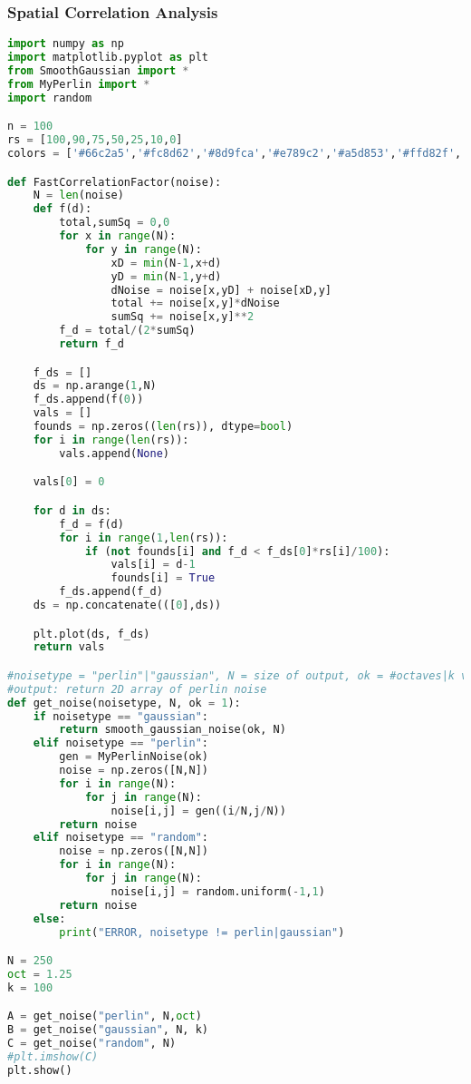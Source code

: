 \documentclass[11pt,a4paper]{article}
\begin{document}
\subsubsection{Spatial Correlation Analysis}
\begin{lstlisting}[language=Python, mathescape=true]
import numpy as np
import matplotlib.pyplot as plt
from SmoothGaussian import *
from MyPerlin import *
import random

n = 100
rs = [100,90,75,50,25,10,0]
colors = ['#66c2a5','#fc8d62','#8d9fca','#e789c2','#a5d853','#ffd82f','#e5c494']

def FastCorrelationFactor(noise):
    N = len(noise)
    def f(d):
        total,sumSq = 0,0
        for x in range(N):
            for y in range(N):
                xD = min(N-1,x+d)
                yD = min(N-1,y+d)
                dNoise = noise[x,yD] + noise[xD,y]
                total += noise[x,y]*dNoise
                sumSq += noise[x,y]**2
        f_d = total/(2*sumSq)
        return f_d

    f_ds = []
    ds = np.arange(1,N)
    f_ds.append(f(0))
    vals = []
    founds = np.zeros((len(rs)), dtype=bool)
    for i in range(len(rs)):
        vals.append(None)

    vals[0] = 0

    for d in ds:
        f_d = f(d)
        for i in range(1,len(rs)):
            if (not founds[i] and f_d < f_ds[0]*rs[i]/100):
                vals[i] = d-1
                founds[i] = True
        f_ds.append(f_d)
    ds = np.concatenate(([0],ds))

    plt.plot(ds, f_ds)
    return vals

#noisetype = "perlin"|"gaussian", N = size of output, ok = #octaves|k value
#output: return 2D array of perlin noise
def get_noise(noisetype, N, ok = 1):
    if noisetype == "gaussian":
        return smooth_gaussian_noise(ok, N)
    elif noisetype == "perlin":
        gen = MyPerlinNoise(ok)
        noise = np.zeros([N,N])
        for i in range(N):
            for j in range(N):
                noise[i,j] = gen((i/N,j/N))
        return noise
    elif noisetype == "random":
        noise = np.zeros([N,N])
        for i in range(N):
            for j in range(N):
                noise[i,j] = random.uniform(-1,1)
        return noise
    else:
        print("ERROR, noisetype != perlin|gaussian")

N = 250
oct = 1.25
k = 100

A = get_noise("perlin", N,oct)
B = get_noise("gaussian", N, k)
C = get_noise("random", N)
#plt.imshow(C)
plt.show()


\end{lstlisting}
\end{document}
